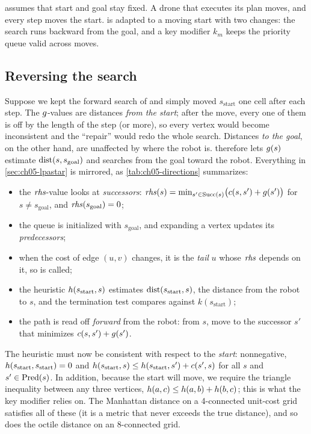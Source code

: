 \lpastar assumes that start and goal stay fixed. A drone that executes its plan moves,
and every step moves the start. \dstarlite \cite{koenig2002dstarlite,koenig2005fast}
is \lpastar adapted to a moving start with two changes: the search runs backward from
the goal, and a key modifier $k_m$ keeps the priority queue valid across moves.

\subsection{Reversing the search}
\label{sec:ch05-reverse}

Suppose we kept the forward search of \lpastar and simply moved $s_{\mathrm{start}}$
one cell after each step. The $g$-values are distances \emph{from the start}; after
the move, every one of them is off by the length of the step (or more), so every vertex
would become inconsistent and the ``repair'' would redo the whole search. Distances
\emph{to the goal}, on the other hand, are unaffected by where the robot is. \dstarlite
therefore lets $g(s)$ estimate $\operatorname{dist}(s, s_{\mathrm{goal}})$ and searches from the
goal toward the robot. Everything in \cref{sec:ch05-lpastar} is mirrored,
as \cref{tab:ch05-directions} summarizes:
\begin{itemize}
  \item the $\mathit{rhs}$-value looks at \emph{successors}:
    $\mathit{rhs}(s) = \min_{s'\in\operatorname{Succ}(s)} \bigl(c(s,s') + g(s')\bigr)$ for
    $s\ne s_{\mathrm{goal}}$, and $\mathit{rhs}(s_{\mathrm{goal}})=0$;
  \item the queue is initialized with $s_{\mathrm{goal}}$, and expanding a vertex
    updates its \emph{predecessors};
  \item when the cost of edge $(u,v)$ changes, it is the \emph{tail} $u$ whose $\mathit{rhs}$
    depends on it, so  is called;
  \item the heuristic $h(s_{\mathrm{start}}, s)$ estimates
    $\operatorname{dist}(s_{\mathrm{start}}, s)$, the distance from the robot to $s$, and the
    termination test compares against $k(s_{\mathrm{start}})$;
  \item the path is read off \emph{forward} from the robot: from $s$, move to the
    successor $s'$ that minimizes $c(s,s') + g(s')$.
\end{itemize}
The heuristic must now be consistent with respect to the \emph{start}: nonnegative,
$h(s_{\mathrm{start}}, s_{\mathrm{start}}) = 0$ and
$h(s_{\mathrm{start}}, s) \le h(s_{\mathrm{start}}, s') + c(s', s)$ for all
$s$ and $s' \in \operatorname{Pred}(s)$. In addition, because
the start will move, we require the triangle inequality between any three vertices,
$h(a,c) \le h(a,b) + h(b,c)$; this is what the key modifier relies on.
The Manhattan distance on a 4-connected unit-cost grid satisfies all of these (it is a
metric that never exceeds the true distance), and so does the octile distance on an
8-connected grid.


